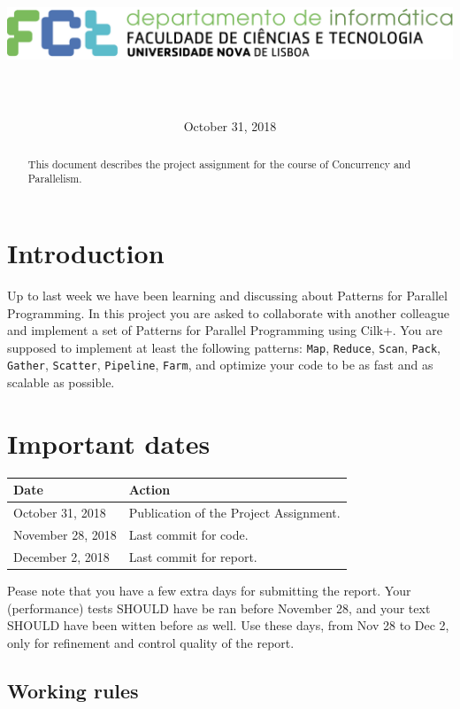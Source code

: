 \documentclass[11pt]{article}
\title{\vspace*{-5ex}\includegraphics[width=0.66\linewidth]{logoDIFCTUNL_horiz-transparente}\\{\LARGE\mycourse}\\{\Large\mytitle}}
\author{\myauthor}
\date{October 31, 2018}
\begin{document}
\maketitle


\begin{abstract}
    This document describes the project assignment for the course of Concurrency and Parallelism.
\end{abstract}

\section{Introduction}

Up to last week we have been learning and discussing about Patterns for Parallel Programming.  In this project you are asked to collaborate with another colleague and implement a set of Patterns for Parallel Programming using Cilk+.  You are supposed to implement at least the following patterns:     \verb!Map!, \verb!Reduce!, \verb!Scan!, \verb!Pack!, \verb!Gather!, \verb!Scatter!, \verb!Pipeline!, \verb!Farm!, and optimize your code to be as fast and as scalable as possible.  

\section{Important dates}

\begin{center}
  \begin{tabular}{ll}
    \toprule
    \textbf{Date} & \textbf{Action}\\
    \midrule
    October 31, 2018 & Publication of the Project Assignment.\\
    November 28, 2018 & Last commit for code.\\
    December 2, 2018 & Last commit for report.\\
    \bottomrule
  \end{tabular}
\end{center}

Pease note that you have a few extra days for submitting the report.    Your (performance) tests SHOULD have be ran before November 28, and your text SHOULD have been witten before as well.  Use these days, from Nov 28 to Dec 2, only for refinement and control quality of the report.

\subsection{Working rules}
\end{document}
